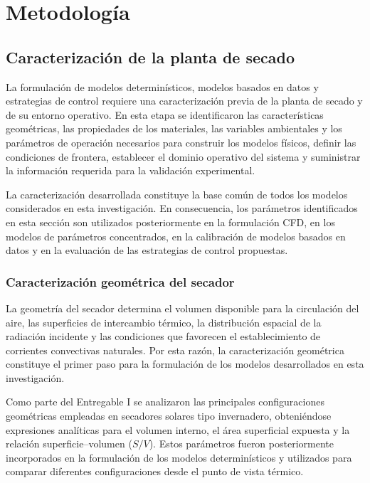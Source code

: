 \chapter{Metodología}


\section{Caracterización de la planta de secado}

La formulación de modelos determinísticos, modelos basados en datos y estrategias de control requiere una caracterización previa de la planta de secado y de su entorno operativo. En esta etapa se identificaron las características geométricas, las propiedades de los materiales, las variables ambientales y los parámetros de operación necesarios para construir los modelos físicos, definir las condiciones de frontera, establecer el dominio operativo del sistema y suministrar la información requerida para la validación experimental.

La caracterización desarrollada constituye la base común de todos los modelos considerados en esta investigación. En consecuencia, los parámetros identificados en esta sección son utilizados posteriormente en la formulación CFD, en los modelos de parámetros concentrados, en la calibración de modelos basados en datos y en la evaluación de las estrategias de control propuestas.

\subsection{Caracterización geométrica del secador}

La geometría del secador determina el volumen disponible para la circulación del aire, las superficies de intercambio térmico, la distribución espacial de la radiación incidente y las condiciones que favorecen el establecimiento de corrientes convectivas naturales. Por esta razón, la caracterización geométrica constituye el primer paso para la formulación de los modelos desarrollados en esta investigación.

Como parte del Entregable I se analizaron las principales configuraciones geométricas empleadas en secadores solares tipo invernadero, obteniéndose expresiones analíticas para el volumen interno, el área superficial expuesta y la relación superficie--volumen ($S/V$). Estos parámetros fueron posteriormente incorporados en la formulación de los modelos determinísticos y utilizados para comparar diferentes configuraciones desde el punto de vista térmico.

